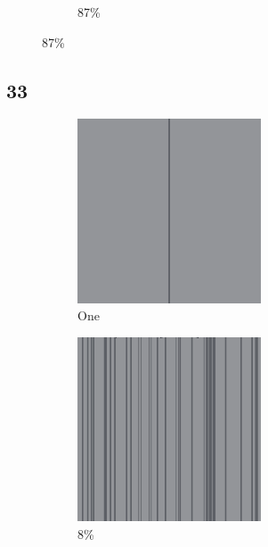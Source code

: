 \documentclass[12pt, fleqn]{report}                             %
\theoremstyle{break}                                            %
\begin{document}
\begin{figure}[ht!]
\begin{subfigure}[b]{0.4\linewidth}
          \caption{87\%}
        \end{subfigure}
      \end{figure}


      \clearpage
      \subsection{33}
      \begin{figure}[ht!]
        \centering
        \begin{subfigure}[b]{0.4\linewidth}
          \includegraphics[width=0.6\textwidth]{Images/33/a.png}
          \caption{One}
        \end{subfigure}
        \begin{subfigure}[b]{0.4\linewidth}
          \includegraphics[width=0.6\textwidth]{Images/33/b.png}
          \caption{8\%}
        \end{subfigure}
        \begin{subfigure}[b]{0.4\linewidth}

\end{subfigure}
\end{figure}
\end{document}
